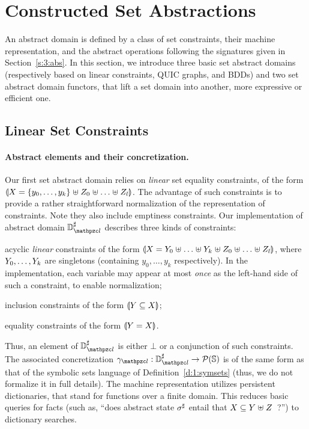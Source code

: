 \section{Constructed Set Abstractions}
\label{sec:constructed} \label{s:4:domains}
An abstract domain is defined by a class of set constraints, their machine
representation, and the abstract operations following the signatures given in
Section~\ref{s:3:abs}.
In this section, we introduce three basic set abstract domains (respectively
based on linear constraints, QUIC graphs, and BDDs) and two set abstract
domain functors, that lift a set domain into another, more expressive or
efficient one.

\subsection{Linear Set Constraints}
\label{s:4:1:lin}
\newcommand{\adomlin}{\adom_{\zcl}}
\newcommand{\gammalin}{\gamma_{\zcl}}
\paragraph{Abstract elements and their concretization.}
Our first set abstract domain relies on {\em linear} set equality
constraints, of the form \( \llparenthesis X = \{ y_0, \ldots, y_k \} \mathrel{\uplus}
  Z_0 \mathrel{\uplus} \ldots \mathrel{\uplus} Z_l \rrparenthesis \).
The advantage of such constraints is to provide a rather straightforward
normalization of the representation of constraints.
Note they also include emptiness constraints.
Our implementation of abstract domain \( \adomlin \) describes three kinds
of constraints:
\begin{compactitem}
\item acyclic {\em linear} constraints of the form \( \llparenthesis X =
    Y_0 \mathrel{\uplus} \ldots \mathrel{\uplus} Y_k \mathrel{\uplus} Z_0 \mathrel{\uplus} \ldots
    \mathrel{\uplus} Z_l \rrparenthesis \), where \( Y_0, \ldots, Y_k \) are
  singletons (containing $y_0, \ldots, y_k$ respectively). In the implementation, each variable may appear at most
  {\em once} as the left-hand side of such a constraint, to enable
  normalization;
\item inclusion constraints of the form \( \llparenthesis Y \subseteq X \rrparenthesis \);
\item equality constraints of the form \( \llparenthesis Y = X \rrparenthesis \).
\end{compactitem}
Thus, an element of \( \adomlin \) is either \( \bot \) or a conjunction of
such constraints.
The associated concretization \( \gammalin: \adomlin \rightarrow
\partsof{\states} \) is of the same form as that of the symbolic sets
language of Definition~\ref{d:1:symsets} (thus, we do not formalize it
in full details).
The machine representation utilizes persistent dictionaries, that stand
for functions over a finite domain.
This reduces basic queries for facts (such as, ``does abstract state
\( {\sigma}^{\sharp} \) entail that \( X \subseteq Y \mathrel{\uplus} Z
\)~?'') to dictionary searches.

